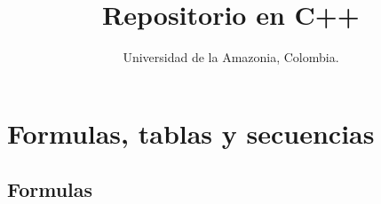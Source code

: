 \documentclass[10pt,landscape,twocolumn,letterpaper,twosided]{article}
\begin{document}
	
	\title{Repositorio en C++}
	\author{Universidad de la Amazonia, Colombia.}
	\maketitle
	
	\section{Formulas, tablas y secuencias}

		\subsection{Formulas}
			\tablefirsthead{}
			\tablelasttail{}
\end{document}
